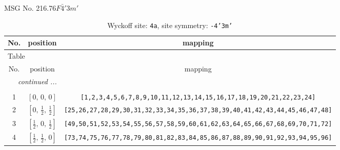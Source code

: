 \documentclass[fleqn,8pt]{jsarticle}
\begin{document}
\setcounter{MaxMatrixCols}{32}

\renewcommand{\tablename}{Table~}
\renewcommand{\figurename}{Figure~}
\begin{center}
\LARGE
MSG No. 216.76\quad$F\bar{4}'3m'$
\end{center}
\renewcommand{\arraystretch}{1.2}
\begin{longtable}{ccc}
\caption{Wyckoff site: {\tt 4a}, site symmetry: {\tt -4'3m'}}
 \\
 \hline \hline
No. & position & mapping \\ \hline \endfirsthead

\multicolumn{2}{l}{\tablename\ \thetable{}} \\
 \hline \hline
No. & position & mapping \\ \hline \endhead

 \hline \hline
\multicolumn{2}{r}{\footnotesize\it continued ...} \\ \endfoot

 \hline \hline
\multicolumn{2}{r}{} \\ \endlastfoot

1 & $\left[ 0,\, 0,\, 0 \right]$ & {\tt [1,2,3,4,5,6,7,8,9,10,11,12,13,14,15,16,17,18,19,20,21,22,23,24]} \\ \hline
2 & $\left[ 0,\, \frac{1}{2},\, \frac{1}{2} \right]$ & {\tt [25,26,27,28,29,30,31,32,33,34,35,36,37,38,39,40,41,42,43,44,45,46,47,48]} \\ \hline
3 & $\left[ \frac{1}{2},\, 0,\, \frac{1}{2} \right]$ & {\tt [49,50,51,52,53,54,55,56,57,58,59,60,61,62,63,64,65,66,67,68,69,70,71,72]} \\ \hline
4 & $\left[ \frac{1}{2},\, \frac{1}{2},\, 0 \right]$ & {\tt [73,74,75,76,77,78,79,80,81,82,83,84,85,86,87,88,89,90,91,92,93,94,95,96]} \\
\end{longtable}
\renewcommand{\arraystretch}{1.2}
\end{document}
